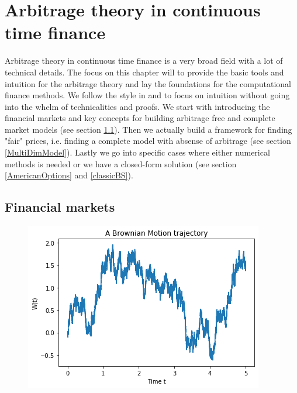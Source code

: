 
\chapter{Arbitrage theory in continuous time finance} %

\label{Chapter2} %

Arbitrage theory in continuous time finance is a very broad field with a lot of technical details. The focus on this chapter will to provide the basic tools and intuition for the arbitrage theory and lay the foundations for the computational finance methods. We follow the style in \parencite{Hull} and \parencite{finKont} to focus on intuition without going into the whelm of technicalities and proofs. We start with introducing the financial markets and key concepts for building arbitrage free and complete market models (see section \ref{FinMarket}). Then we actually build a framework for finding "fair" prices, i.e. finding a complete model with absense of arbitrage (see section \ref{MultiDimModel}). Lastly we go into specific cases where either numerical methods is needed or we have a closed-form solution (see section \ref{AmericanOptions} and \ref{classicBS}).


\section{Financial markets}\label{FinMarket}

\begin{figure}[th]
\centering
\includegraphics{Figures/brownianMotion.png}
\decoRule
\caption[A Wiener process trajectory]{}
\label{fig:BM}
\end{figure}


